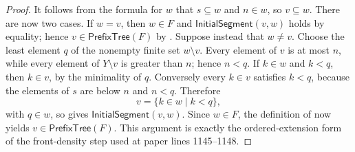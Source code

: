 \begin{proof}
It follows from the formula for $w$ that $s\subseteq w$ and $n\in w$,
so $v\subseteq w$.  There are now two cases.  If $w=v$, then
$w\in F$ and $\mathsf{InitialSegment}(v,w)$ holds by equality; hence
$v\in\mathsf{PrefixTree}(F)$ by .  Suppose instead
that $w\ne v$.  Choose the least element $q$ of the nonempty finite set
$w\setminus v$.  Every element of $v$ is at most $n$, while every element
of $Y\setminus v$ is greater than $n$; hence $n<q$.  If $k\in w$ and
$k<q$, then $k\in v$, by the minimality of $q$.  Conversely every
$k\in v$ satisfies $k<q$, because the elements of $s$ are below $n$ and
$n<q$.  Therefore
\[
  v=\{k\in w\mid k<q\},
\]
with $q\in w$, so  gives
$\mathsf{InitialSegment}(v,w)$.  Since $w\in F$, the definition of
 now yields $v\in\mathsf{PrefixTree}(F)$.
This argument is exactly the ordered-extension form of the front-density
step used at paper lines 1145--1148.
\end{proof}
